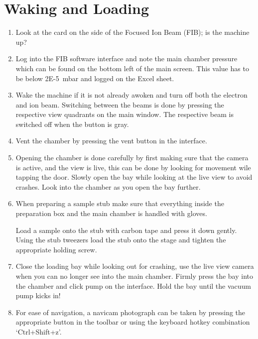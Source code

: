 \documentclass[a4paper]{scrartcl}
\begin{document}
\section*{Waking and Loading}
\begin{enumerate}
	\item Look at the card on the side of the Focused Ion Beam (FIB); is the machine up?
	\item Log into the FIB software interface and note the main chamber pressure which can be found on the bottom left of the main screen. This value has to be below \SI{2E-5}{\milli \bar} and logged on the Excel sheet.
	\item Wake the machine if it is not already awoken and turn off both the electron and ion beam. Switching between the beams is done by pressing the respective view quadrants on the main window. The respective beam is switched off when the button is gray.
	\item  Vent the chamber by pressing the vent button in the interface.
	\item Opening the chamber is done carefully by first making sure that the camera is active, and the view is live, this can be done by looking for movement wile tapping the door. Slowly open the bay while looking at the live view to avoid crashes. Look into the chamber as you open the bay further.
	\item \colorbox{warning!30}{\parbox{\linewidth}{When preparing a sample stub make sure that everything inside the preparation box and the main chamber is handled with gloves.}} Load a sample onto the stub with carbon tape and press it down gently. Using the stub tweezers load the stub onto the stage and tighten the appropriate holding screw.
	\item Close the loading bay while looking out for crashing, use the live view camera when you can no longer see into the main chamber. Firmly press the bay into the chamber and click pump on the interface. Hold the bay until the vacuum pump kicks in!
	\item For ease of navigation, a navicam photograph can be taken by pressing the appropriate button in the toolbar or using the keyboard hotkey combination `Ctrl+Shift+z'.
\end{enumerate}
\end{document}
